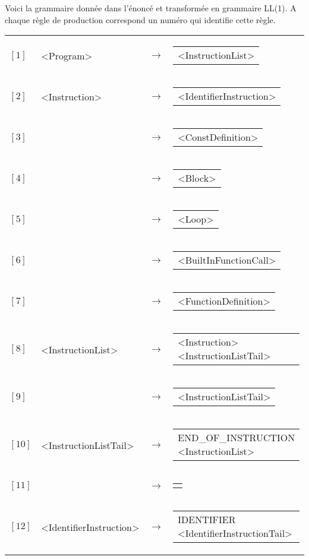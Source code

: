 \documentclass[a4paper,10pt]{article}
\begin{document}
Voici la grammaire donnée dans l'énoncé et transformée en grammaire LL(1). A chaque règle de production correspond un numéro qui identifie cette règle.

\begin{longtable}{llll}
$[1]$&<Program>&$\rightarrow$&\begin{tabular}[t]{@{}l@{}}<InstructionList> \end{tabular}\\
$[2]$&<Instruction>&$\rightarrow$&\begin{tabular}[t]{@{}l@{}}<IdentifierInstruction> \end{tabular}\\
$[3]$&&$\rightarrow$&\begin{tabular}[t]{@{}l@{}}<ConstDefinition> \end{tabular}\\
$[4]$&&$\rightarrow$&\begin{tabular}[t]{@{}l@{}}<Block> \end{tabular}\\
$[5]$&&$\rightarrow$&\begin{tabular}[t]{@{}l@{}}<Loop> \end{tabular}\\
$[6]$&&$\rightarrow$&\begin{tabular}[t]{@{}l@{}}<BuiltInFunctionCall> \end{tabular}\\
$[7]$&&$\rightarrow$&\begin{tabular}[t]{@{}l@{}}<FunctionDefinition> \end{tabular}\\
$[8]$&<InstructionList>&$\rightarrow$&\begin{tabular}[t]{@{}l@{}}<Instruction> <InstructionListTail> \end{tabular}\\
$[9]$&&$\rightarrow$&\begin{tabular}[t]{@{}l@{}}<InstructionListTail> \end{tabular}\\
$[10]$&<InstructionListTail>&$\rightarrow$&\begin{tabular}[t]{@{}l@{}}END\_OF\_INSTRUCTION <InstructionList> \end{tabular}\\
$[11]$&&$\rightarrow$&\begin{tabular}[t]{@{}l@{}}$\epsilon$ \end{tabular}\\
$[12]$&<IdentifierInstruction>&$\rightarrow$&\begin{tabular}[t]{@{}l@{}}IDENTIFIER <IdentifierInstructionTail> \end{tabular}\\

\end{longtable}
\end{document}
